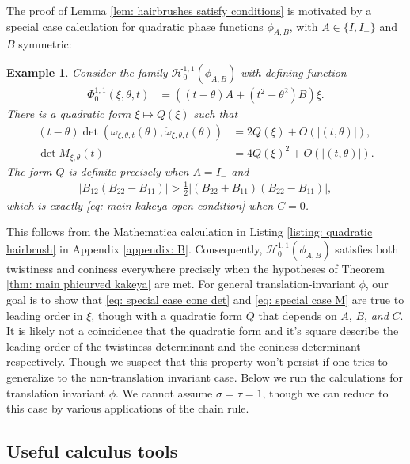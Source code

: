 \documentclass[12pt]{amsart}
\numberwithin{equation}{section}
\newtheorem{example}[lemma]{Example}
\newcommand{\1}{\mathbbm{1}}
\begin{document}
The proof of Lemma \ref{lem: hairbrushes satisfy conditions} is motivated by a special case calculation for quadratic phase functions $\phi_{A,B}$, with $A \in \{I, I_-\}$ and $B$ symmetric: 
\begin{example}\label{ex: special case for pf of conetwist hairbrush}
    Consider the family $\mathcal H_{0}^{1,1}(\phi_{A,B})$ with defining function 
    \begin{align}\label{eq: special case cone det}
        \Phi^{1,1}_0(\xi, \theta, t) &= ((t-\theta)A + (t^2 - \theta^2) B)\xi. 
    \end{align}
    There is a quadratic form $\xi \mapsto Q(\xi)$ such that 
    \begin{align}\label{eq: special case M}
    (t - \theta) \det(\dot \omega_{\xi,\theta,t}(\theta), \ddot  \omega_{\xi,\theta,t}(\theta)) &= 2Q(\xi) + O(|(t,\theta)|), \\
        \det M_{\xi, \theta}(t) &= 4Q(\xi)^2 + O(|(t,\theta)|).
    \end{align}
    The form $Q$ is definite precisely when $A = I_-$ and 
    \begin{align}
        |B_{12}(B_{22} - B_{11})| > \frac{1}{2} |(B_{22} + B_{11})(B_{22} - B_{11})|, 
    \end{align}
    which is exactly \eqref{eq: main kakeya open condition} when $C = 0$. 
\end{example}
This follows from the Mathematica calculation in Listing \ref{listing: quadratic hairbrush} in Appendix \ref{appendix: B}. Consequently, $\mathcal H_0^{1,1}(\phi_{A,B})$ satisfies both twistiness and coniness everywhere precisely when the hypotheses of Theorem \ref{thm: main phicurved kakeya} are met. 
For general translation-invariant $\phi$, our goal is to show that \eqref{eq: special case cone det} and \eqref{eq: special case M} are true to leading order in $\xi$, though with a quadratic form $Q$ that depends on $A$, $B$, \emph{and} $C$. It is likely not a coincidence that the quadratic form and it's square describe the leading order of the twistiness determinant and the coniness determinant respectively. Though we suspect that this property won't persist if one tries to generalize to the non-translation invariant case. Below we run the calculations for translation invariant $\phi$. We cannot assume $\sigma = \tau = 1$, though we can reduce to this case by various applications of the chain rule. 

\subsection{Useful calculus tools}
\end{document}
